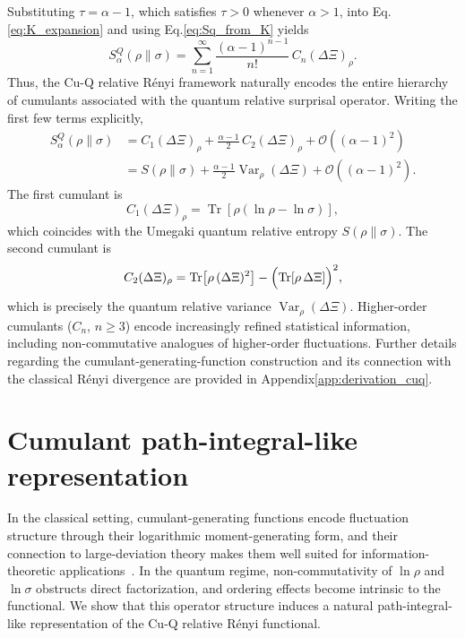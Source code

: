 \documentclass[a4paper, amsfonts, amssymb, amsmath, reprint, showkeys, nofootinbib, twoside, aps, pra]{revtex4-2}
\theoremstyle{definition}
\begin{document}
Substituting $\tau=\alpha-1$, which satisfies $\tau>0$ whenever $\alpha>1$, into Eq.\eqref{eq:K_expansion} and using Eq.\eqref{eq:Sq_from_K} yields
\begin{equation}
\label{eq:cumulant_expansion}
    S_\alpha^Q(\rho\|\sigma)
    =
    \sum_{n=1}^{\infty}
    \frac{(\alpha-1)^{n-1}}{n!}\,
    C_n(\Delta\Xi)_\rho.
\end{equation}
Thus, the Cu-Q relative Rényi framework naturally encodes the entire hierarchy of cumulants associated with the quantum relative surprisal
operator. Writing the first few terms explicitly,
\begin{align}
\label{eq:first_terms}
    S_\alpha^Q(\rho\|\sigma)
    &=
    C_1(\Delta\Xi)_\rho
    + \frac{\alpha-1}{2}\,C_2(\Delta\Xi)_\rho
    + \mathcal{O}\!\left((\alpha-1)^2\right) \nonumber \\
    &=
    S(\rho\|\sigma)
    + \frac{\alpha-1}{2}\operatorname{Var}_\rho(\Delta\Xi)
    + \mathcal{O}\!\left((\alpha-1)^2\right).
\end{align}
The first cumulant is
\begin{equation}
    C_1(\Delta\Xi)_\rho
    =
    \operatorname{Tr}\!\left[\rho(\ln\rho - \ln\sigma)\right],
\end{equation}
which coincides with the Umegaki quantum relative entropy $S(\rho\|\sigma)$.
The second cumulant is
\begin{equation}
    C_2(\Delta\Xi)_\rho
    =
    \operatorname{Tr}\!\left[\rho\,(\Delta\Xi)^2\right]
    -
    \Bigl(\operatorname{Tr}\!\left[\rho\,\Delta\Xi\right]\Bigr)^2,
\end{equation}
which is precisely the quantum relative variance
$\operatorname{Var}_\rho(\Delta\Xi)$. Higher-order cumulants ($C_n$, $n\ge 3$) encode increasingly refined statistical information, including non-commutative analogues of higher-order fluctuations. Further details regarding the cumulant-generating-function construction and its connection with the classical Rényi divergence are provided in Appendix\ref{app:derivation_cuq}.

\section{Cumulant path-integral-like representation}

In the classical setting, cumulant-generating functions encode fluctuation structure through their logarithmic moment-generating form, and their connection to large-deviation theory makes them well suited for information-theoretic applications~\cite{Touchette2009,Esposito2009}. In the quantum regime, non-commutativity of $\ln\rho$ and $\ln\sigma$ obstructs direct factorization, and ordering effects become intrinsic 
to the functional. We show that this operator structure induces a natural path-integral-like representation of the Cu-Q relative Rényi functional.
\end{document}
